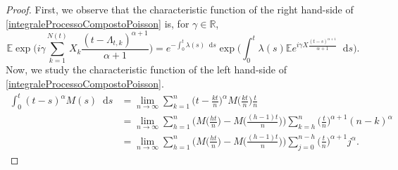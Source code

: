 \documentclass[12pt, twoside, english, headsepline]{article}
\newcommand*\dif{\mathop{}\!\mathrm{d}}  %
\theoremstyle{definition} %
\numberwithin{equation}{section} %
\begin{document}
\begin{proof}
	First, we observe that the characteristic function of the right hand-side of \eqref{integraleProcessoCompostoPoisson} is, for $\gamma \in\mathbb{R}$,
	\begin{equation}
		\mathbb{E}\exp\Bigg( i\gamma \sum_{k=1}^{N(t)} X_k\frac{(t-\Lambda_{t,k})^{\alpha+1}}{\alpha+1} \Bigg)= e^{-\int_0^t \lambda(s)\dif s} \exp\Bigg( \int_0^t \lambda(s) \mathbb{E} e^{i\gamma X \frac{(t-s)^{\alpha+1}}{ \alpha+1} }\dif s \Bigg).
	\end{equation}
	Now, we study the characteristic function of the left hand-side of \eqref{integraleProcessoCompostoPoisson}.
\begin{align}
\int_0^t (t-s)^\alpha M(s)\dif s & = 	\lim_{n\rightarrow \infty} \sum_{k=1}^n \bigg(t-\frac{kt}{n}\bigg)^\alpha M\bigg(\frac{kt}{n}\bigg)\frac{t}{n}\nonumber \\
& =  \lim_{n\rightarrow \infty} \sum_{h=1}^n \Bigg(M\bigg(\frac{ht}{n}\bigg) - M\bigg(\frac{(h-1)t}{n}\bigg) \Bigg) \sum_{k = h}^n \bigg(\frac{t}{n}\bigg)^{\alpha+1}(n-k)^\alpha \nonumber \\
&= \lim_{n\rightarrow \infty} \sum_{h=1}^n \Bigg(M\bigg(\frac{ht}{n}\bigg) - M\bigg(\frac{(h-1)t}{n}\bigg) \Bigg) \sum_{j = 0}^{n-h} \bigg(\frac{t}{n}\bigg)^{\alpha+1} j^\alpha .\label{primaRappresentazioneIntegraleFrazinarioCompound}
\end{align}


\end{proof}
\end{document}
